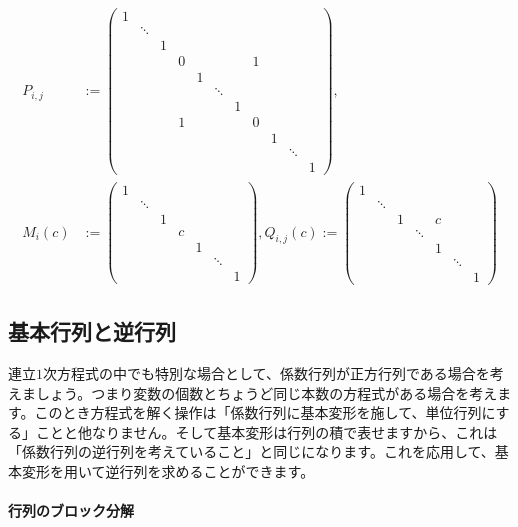 \begin{align*}
P_{i,j} &:= %
\begin{pmatrix}
1 & \\
 & \ddots  &  \\
 & & 1 \\
 & & & 0 & & & & 1 \\
 & & & & 1 &  \\
 & & & & & \ddots &  \\
 & & & & & & 1  \\
 & & & 1 & & & & 0 \\
 & & & & & & & & 1 \\
 & & & & & & & & & \ddots \\
 & & & & & & & & & & 1 
\end{pmatrix}, \\
M_i(c) &:= %
\begin{pmatrix}
1 & \\
& \ddots \\
& & 1 \\
& & & c \\
& & & & 1 \\
& & & & & \ddots \\
& & & & & & 1
\end{pmatrix}, 
Q_{i,j}(c) := %
\begin{pmatrix}
1 & \\
& \ddots \\
& & 1 &  & c \\
& & & \ddots &  \\
& & & & 1 \\
& & & & & \ddots \\
& & & & & & 1
\end{pmatrix}
\end{align*}

\subsection{基本行列と逆行列}

連立$1$次方程式の中でも特別な場合として、係数行列が正方行列である場合を考えましょう。つまり変数の個数とちょうど同じ本数の方程式がある場合を考えます。このとき方程式を解く操作は「係数行列に基本変形を施して、単位行列にする」ことと他なりません。そして基本変形は行列の積で表せますから、これは「係数行列の逆行列を考えていること」と同じになります。これを応用して、基本変形を用いて逆行列を求めることができます。

\paragraph{行列のブロック分解}

